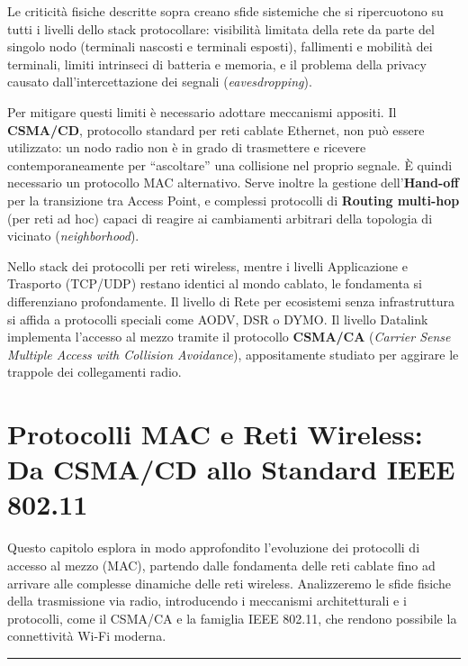 \documentclass[
  italian,
  openany]{book}
\begin{document}
Le criticità fisiche descritte sopra creano sfide sistemiche che si
ripercuotono su tutti i livelli dello stack protocollare: visibilità
limitata della rete da parte del singolo nodo (terminali nascosti e
terminali esposti), fallimenti e mobilità dei terminali, limiti
intrinseci di batteria e memoria, e il problema della privacy causato
dall'intercettazione dei segnali (\emph{eavesdropping}).

Per mitigare questi limiti è necessario adottare meccanismi appositi. Il
\textbf{CSMA/CD}, protocollo standard per reti cablate Ethernet, non può
essere utilizzato: un nodo radio non è in grado di trasmettere e
ricevere contemporaneamente per ``ascoltare'' una collisione nel proprio
segnale. È quindi necessario un protocollo MAC alternativo. Serve
inoltre la gestione dell'\textbf{Hand-off} per la transizione tra Access
Point, e complessi protocolli di \textbf{Routing multi-hop} (per reti ad
hoc) capaci di reagire ai cambiamenti arbitrari della topologia di
vicinato (\emph{neighborhood}).

Nello stack dei protocolli per reti wireless, mentre i livelli
Applicazione e Trasporto (TCP/UDP) restano identici al mondo cablato, le
fondamenta si differenziano profondamente. Il livello di Rete per
ecosistemi senza infrastruttura si affida a protocolli speciali come
AODV, DSR o DYMO. Il livello Datalink implementa l'accesso al mezzo
tramite il protocollo \textbf{CSMA/CA} (\emph{Carrier Sense Multiple
Access with Collision Avoidance}), appositamente studiato per aggirare
le trappole dei collegamenti radio.

\newpage

\chapter{Protocolli MAC e Reti Wireless: Da CSMA/CD allo Standard IEEE
802.11}\label{protocolli-mac-e-reti-wireless-da-csmacd-allo-standard-ieee-802.11}

Questo capitolo esplora in modo approfondito l'evoluzione dei protocolli
di accesso al mezzo (MAC), partendo dalle fondamenta delle reti cablate
fino ad arrivare alle complesse dinamiche delle reti wireless.
Analizzeremo le sfide fisiche della trasmissione via radio, introducendo
i meccanismi architetturali e i protocolli, come il CSMA/CA e la
famiglia IEEE 802.11, che rendono possibile la connettività Wi-Fi
moderna.

\begin{center}\rule{0.5\linewidth}{0.5pt}\end{center}
\end{document}
